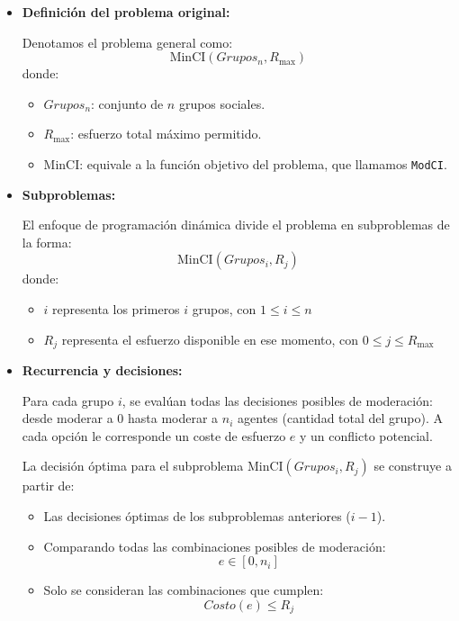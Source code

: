 \documentclass[11pt,letter]{article}
\begin{document}
\begin{itemize}
    \item \textbf{Definición del problema original:}


    Denotamos el problema general como:
    \[
        \text{MinCI}(Grupos_n, R_{\text{max}})
    \]
    donde:
    \begin{itemize}
        \item $Grupos_n$: conjunto de $n$ grupos sociales.
        \item $R_{\text{max}}$: esfuerzo total máximo permitido.
        \item $\text{MinCI}$: equivale a la función objetivo del problema, que llamamos \texttt{ModCI}.
    \end{itemize}


    \item \textbf{Subproblemas:}


    El enfoque de programación dinámica divide el problema en subproblemas de la forma:
    \[
        \text{MinCI}(Grupos_i, R_j)
    \]
    donde:
    \begin{itemize}
        \item $i$ representa los primeros $i$ grupos, con $1 \leq i \leq n$
        \item $R_j$ representa el esfuerzo disponible en ese momento, con $0 \leq j \leq R_{\text{max}}$
    \end{itemize}


    \item \textbf{Recurrencia y decisiones:}


    Para cada grupo $i$, se evalúan todas las decisiones posibles de moderación: desde moderar a $0$ hasta moderar a $n_i$ agentes (cantidad total del grupo). A cada opción le corresponde un coste de esfuerzo $e$ y un conflicto potencial.


    La decisión óptima para el subproblema $\text{MinCI}(Grupos_i, R_j)$ se construye a partir de:
    \begin{itemize}
        \item Las decisiones óptimas de los subproblemas anteriores ($i - 1$).
        \item Comparando todas las combinaciones posibles de moderación:
        \[
            e \in [0, n_i]
        \]
        \item Solo se consideran las combinaciones que cumplen:
        \[
            Costo(e) \leq R_j
        \]
    \end{itemize}



\end{itemize}
\end{document}
